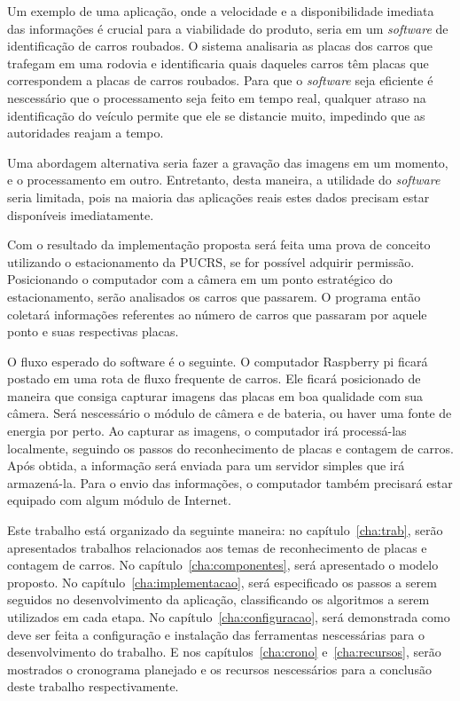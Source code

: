 Um exemplo de uma aplicação, onde a velocidade e a disponibilidade imediata das
informações é crucial para a viabilidade do produto, seria em um \emph{software}
de identificação de carros roubados. O sistema analisaria as placas dos carros
que trafegam em uma rodovia e identificaria quais daqueles carros têm placas que
correspondem a placas de carros roubados. Para que o \emph{software} seja
eficiente é nescessário que o processamento seja feito em tempo real, qualquer
atraso na identificação do veículo permite que ele se distancie muito, impedindo
que as autoridades reajam a tempo.

Uma abordagem alternativa seria fazer a gravação das imagens em um momento, e o
processamento em outro. Entretanto, desta maneira, a utilidade do
\emph{software} seria limitada, pois na maioria das aplicações reais estes dados
precisam estar disponíveis imediatamente.

Com o resultado da implementação proposta será feita uma prova de conceito
utilizando o estacionamento da PUCRS, se for possível adquirir permissão.
Posicionando o computador com a câmera em um ponto estratégico do
estacionamento, serão analisados os carros que passarem. O programa então
coletará informações referentes ao número de carros que passaram por aquele ponto
e suas respectivas placas.

O fluxo esperado do software é o seguinte. O computador Raspberry pi ficará
postado em uma rota de fluxo frequente de carros. Ele ficará posicionado de
maneira que consiga capturar imagens das placas em boa qualidade com sua câmera.
Será nescessário o módulo de câmera e de bateria, ou haver uma fonte de energia
por perto. Ao capturar as imagens, o computador irá processá-las localmente,
seguindo os passos do reconhecimento de placas e contagem de carros.  Após
obtida, a informação será enviada para um servidor simples que irá armazená-la.
Para o envio das informações, o computador também precisará estar equipado com
algum módulo de Internet.

Este trabalho está organizado da seguinte maneira: no capítulo~\ref{cha:trab},
serão apresentados trabalhos relacionados aos temas de reconhecimento de placas
e contagem de carros. No capítulo~\ref{cha:componentes}, será apresentado o modelo
proposto. No capítulo~\ref{cha:implementacao}, será especificado os passos a serem
seguidos no desenvolvimento da aplicação, classificando os algoritmos a serem utilizados
em cada etapa. No capítulo~\ref{cha:configuracao}, será demonstrada como deve ser feita
a configuração e instalação das ferramentas nescessárias para o desenvolvimento do trabalho.
 E nos capítulos~\ref{cha:crono}  e~\ref{cha:recursos}, serão mostrados
o cronograma planejado e os recursos nescessários para a conclusão deste
trabalho respectivamente.
